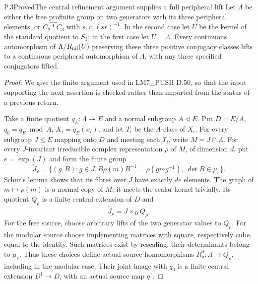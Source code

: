 \begin{statement}{P.3}{Proved}{The central refinement argument supplies a full peripheral lift}
Let $\Lambda$ be either the free profinite group on two generators
with its three peripheral elements, or
$\widehat{C_2*C_3}$ with $s,r,(sr)^{-1}$.
In the second case let $U$ be the kernel of the standard quotient
to $S_3$; in the first case let $U=\Lambda$.
Every continuous automorphism of
$\Lambda/R_{\rm nil}(U)$ preserving these three positive
conjugacy classes lifts to a continuous peripheral automorphism of
$\Lambda$, with any three specified conjugators lifted.
\end{statement}
\begin{proof}
We give the finite argument used in LM7\_PUSH D.50, so that the
input supporting the next assertion is checked rather than imported
from the status of a previous return.

Take a finite quotient $q_E:\Lambda\twoheadrightarrow E$ and a
normal subgroup $A\triangleleft E$. Put $D=E/A$, $q_0=q_E\bmod A$,
$X_i=q_E(x_i)$, and let $T_i$ be the $A$-class of $X_i$.
For every subgroup $J\leq E$ mapping onto $D$ and meeting each
$T_i$, write $M=J\cap A$. For every $J$-invariant irreducible
complex representation $\rho$ of $M$, of dimension $d$, put
$e=\exp(J)$ and form the finite group
\[
 \widetilde J_\rho=\{(g,B):g\in J,
 B\rho(m)B^{-1}=\rho(gmg^{-1}),\ \det B\in\mu_e\}.
\]
Schur's lemma shows that its fibres over $J$ have exactly $de$
elements. The graph of $m\mapsto\rho(m)$ is a normal copy of
$M$; it meets the scalar kernel trivially. Its quotient $Q_\rho$
is a finite central extension of $D$ and
\[
                 \widetilde J_\rho=J\mathbin{\times}_D Q_\rho.
\]
For the free source, choose arbitrary lifts of the two generator
values to $Q_\rho$. For the modular source choose implementing
matrices with square, respectively cube, equal to the identity.
Such matrices exist by rescaling; their determinants belong to
$\mu_e$. Thus these choices define actual source homomorphisms
$R^0_\rho:\Lambda\to Q_\rho$, including in the modular case.
Their joint image with $q_0$ is a finite central extension
$D^\dagger\to D$, with an actual source map $q^\dagger$.


\end{proof}
